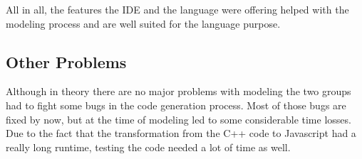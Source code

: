 All in all, the features the IDE and the language were offering helped with the modeling process and are well suited for the language purpose.

\subsection{Other Problems}
Although in theory there are no major problems with modeling the two groups had to fight some bugs in the code generation process. Most of those bugs are fixed by now, but at the time of modeling led to some considerable time losses. Due to the fact that the transformation from the C++ code to Javascript had a really long runtime, testing the code needed a lot of time as well.



